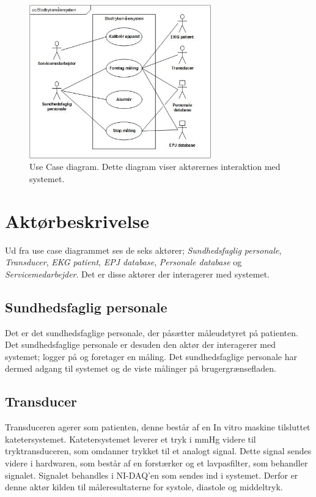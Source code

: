 \begin{figure}[H]
\includegraphics[width =0.7\textwidth , center]{billeder/UseCaseDiagram}
\caption{Use Case diagram. Dette diagram viser aktørernes interaktion med systemet.}
\end{figure}
\section{Aktørbeskrivelse}
Ud fra use case diagrammet ses de seks aktører; \textit{Sundhedsfaglig personale}, \textit{Transducer}, \textit{EKG patient}, \textit{EPJ database}, \textit{Personale database} og \textit{Servicemedarbejder}. Det er disse aktører der interagerer med systemet.
\subsection{Sundhedsfaglig personale}
Det er det sundhedsfaglige personale, der påsætter måleudstyret på patienten. Det sundhedsfaglige personale er desuden den aktør der interagerer med systemet; logger på og foretager en måling. Det sundhedsfaglige personale har dermed adgang til systemet og de viste målinger på brugergrænsefladen.
\subsection{Transducer}
Transduceren agerer som patienten, denne består af en In vitro maskine tilsluttet katetersystemet. Katetersystemet leverer et tryk i mmHg videre til tryktransduceren, som omdanner trykket til et analogt signal. Dette signal sendes videre i hardwaren, som består af en forstærker og et lavpasfilter, som behandler signalet. Signalet behandles i NI-DAQ'en som sendes ind i systemet. Derfor er denne aktør kilden til måleresultaterne for systole, diastole og middeltryk.
